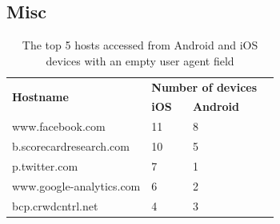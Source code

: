 \subsection{Misc}

\begin{table}
\begin{tabular}{|l|l|l|l|}
\hline
\multirow{2}{*}{\bf Hostname} & \multicolumn{2}{|c|}{\bf Number of devices}\tabularnewline
\cline{2-3}
    & {\bf iOS} & {\bf Android} \tabularnewline
\hline
www.facebook.com & 11 & 8 \tabularnewline
b.scorecardresearch.com	& 10 &	5 \tabularnewline
p.twitter.com	& 7 & 1 \tabularnewline
www.google-analytics.com &  6 & 2 \tabularnewline
bcp.crwdcntrl.net & 4 &	3 \tabularnewline
\hline
\end{tabular}
\caption{The top 5 hosts accessed from Android and iOS devices with an empty user agent field}
\label{tab:top-hosts-empty-agent}
\end{table}





